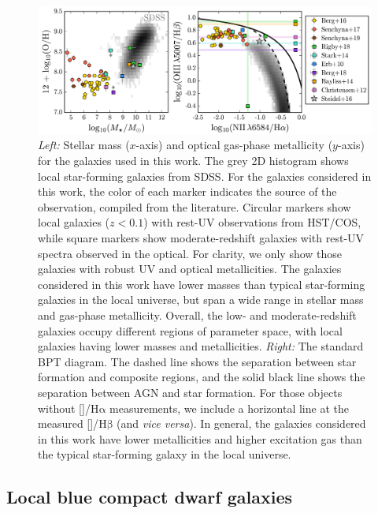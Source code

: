 \documentclass[trackchanges, preprint2]{aastex62}
\newcommand{\nii}{[\ion{N}{2}]}
\newcommand{\oiii}{[\ion{O}{3}]}
\newcommand{\ha}{\ensuremath{\mathrm{H\alpha}}\xspace}
\newcommand{\hb}{\ensuremath{\mathrm{H\beta}}\xspace}
\begin{document}
\begin{figure}
  \begin{center}
    \includegraphics[width=\linewidth]{figs/f1.png}
    \caption{\emph{Left:} Stellar mass ($x$-axis) and optical gas-phase metallicity ($y$-axis) for the galaxies used in this work. The grey 2D histogram shows local star-forming galaxies from SDSS. For the galaxies considered in this work, the color of each marker indicates the source of the observation, compiled from the literature. Circular markers show local galaxies ($z<0.1$) with rest-UV observations from HST/COS, while square markers show moderate-redshift galaxies with rest-UV spectra observed in the optical. For clarity, we only show those galaxies with robust UV and optical metallicities. The galaxies considered in this work have lower masses than typical star-forming galaxies in the local universe, but span a wide range in stellar mass and gas-phase metallicity. Overall, the low- and moderate-redshift galaxies occupy different regions of parameter space, with local galaxies having lower masses and metallicities. \emph{Right:} The standard BPT diagram. The dashed line shows the \citet{Kauffmann+2003b} separation between star formation and composite regions, and the solid black line shows the \citet{Kewley+2001} separation between AGN and star formation. For those objects without \nii{}/\ha{} measurements, we include a horizontal line at the measured \oiii{}/\hb{} (and \emph{vice versa}). In general, the galaxies considered in this work have lower metallicities and higher excitation gas than the typical star-forming galaxy in the local universe.}
    \label{fig:sampleMZ}
  \end{center}
\end{figure}

\subsection{Local blue compact dwarf galaxies}\label{sec:data:BCDs}
\end{document}
